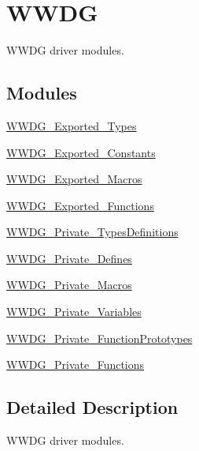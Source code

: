 \hypertarget{group___w_w_d_g}{}\section{W\+W\+DG}
\label{group___w_w_d_g}


W\+W\+DG driver modules.  


\subsection*{Modules}
\begin{DoxyCompactItemize}
\item 
\mbox{\hyperlink{group___w_w_d_g___exported___types}{W\+W\+D\+G\+\_\+\+Exported\+\_\+\+Types}}
\item 
\mbox{\hyperlink{group___w_w_d_g___exported___constants}{W\+W\+D\+G\+\_\+\+Exported\+\_\+\+Constants}}
\item 
\mbox{\hyperlink{group___w_w_d_g___exported___macros}{W\+W\+D\+G\+\_\+\+Exported\+\_\+\+Macros}}
\item 
\mbox{\hyperlink{group___w_w_d_g___exported___functions}{W\+W\+D\+G\+\_\+\+Exported\+\_\+\+Functions}}
\item 
\mbox{\hyperlink{group___w_w_d_g___private___types_definitions}{W\+W\+D\+G\+\_\+\+Private\+\_\+\+Types\+Definitions}}
\item 
\mbox{\hyperlink{group___w_w_d_g___private___defines}{W\+W\+D\+G\+\_\+\+Private\+\_\+\+Defines}}
\item 
\mbox{\hyperlink{group___w_w_d_g___private___macros}{W\+W\+D\+G\+\_\+\+Private\+\_\+\+Macros}}
\item 
\mbox{\hyperlink{group___w_w_d_g___private___variables}{W\+W\+D\+G\+\_\+\+Private\+\_\+\+Variables}}
\item 
\mbox{\hyperlink{group___w_w_d_g___private___function_prototypes}{W\+W\+D\+G\+\_\+\+Private\+\_\+\+Function\+Prototypes}}
\item 
\mbox{\hyperlink{group___w_w_d_g___private___functions}{W\+W\+D\+G\+\_\+\+Private\+\_\+\+Functions}}
\end{DoxyCompactItemize}


\subsection{Detailed Description}
W\+W\+DG driver modules. 

